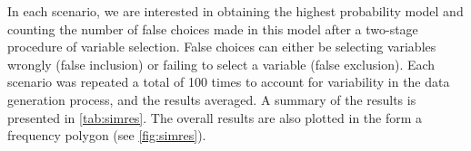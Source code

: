 \documentclass[showframe,11pt,twoside,openright]{report}
\begin{document}
In each scenario, we are interested in obtaining the highest probability model and counting the number of false choices made in this model after a two-stage procedure of variable selection.
False choices can either be selecting variables wrongly (false inclusion) or failing to select a variable (false exclusion).
Each scenario was repeated a total of 100 times to account for variability in the data generation process, and the results averaged. 
A summary of the results is presented in \cref{tab:simres}.
The overall results are also plotted in the form a frequency polygon (see \cref{fig:simres}).

\end{document}
